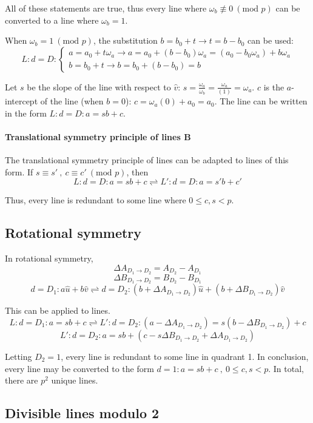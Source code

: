 \documentclass{article}
\begin{document}
All of these statements are true, thus every line where \(\omega_b \not\equiv 0\ (\text{mod }p)\) can be converted to a line where \(\omega_b = 1\).

When \(\omega_b = 1\ (\text{mod }p)\), the substitution \(b=b_0+t \rightarrow t=b-b_0\) can be used:
	\[L:d=D:\begin{cases}
			a=a_0+t\omega_a \rightarrow a=a_0+(b-b_0)\omega_a=(a_0-b_0\omega_a)+b\omega_a \\
			b=b_0+t \rightarrow b=b_0+(b-b_0)=b
			\end{cases}\]

Let \(s\) be the slope of the line with respect to \(\hat{v}\): \(s = \frac{\omega_a}{\omega_b} = \frac{\omega_a}{(1)} = \omega_a\). \(c\) is the \(a\)-intercept of the line (when \(b=0\)): \(c = \omega_a(0) + a_0 = a_0\). The line can be written in the form \(L:d=D:a=sb+c\).

\paragraph{Translational symmetry principle of lines B} The translational symmetry principle of lines can be adapted to lines of this form. If \(s \equiv s'\ ,\ c \equiv c'\ (\text{mod }p)\), then
	\[L:d=D:a=sb+c \rightleftharpoons L':d=D:a=s' b+c'\] 

Thus, every line is redundant to some line where \(0 \leq c,s < p\).


\subsection{Rotational symmetry}

In rotational symmetry,
	\[\Delta A_{D_1 \rightarrow D_2} = A_{D_2}-A_{D_1}\]
	\[\Delta B_{D_1 \rightarrow D_2} = B_{D_2}-B_{D_1}\] 	
	\[d=D_1:a\hat{u}+b\hat{v} \rightleftharpoons d=D_2:(b + \Delta A_{D_1 \rightarrow D_2})\hat{u}+(b + \Delta B_{D_1 \rightarrow D_2})\hat{v}\]
	
This can be applied to lines.
	\[L:d=D_1:a=sb+c \rightleftharpoons L':d=D_2:(a - \Delta A_{D_1 \rightarrow D_2})=s(b - \Delta B_{D_1 \rightarrow D_2})+c\]
	\[L':d=D_2:a=sb + (c-s\Delta B_{D_1 \rightarrow D_2}+\Delta A_{D_1 \rightarrow D_2})\]

Letting \(D_2=1\), every line is redundant to some line in quadrant 1. In conclusion, every line may be converted to the form \(d=1:a=sb+c\ ,\ 0 \leq c,s < p\). In total, there are \(p^2\) unique lines.


\subsection{Divisible lines modulo 2}
\end{document}
